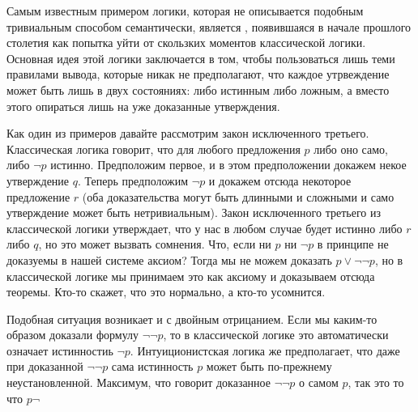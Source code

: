 Самым известным примером логики, которая не описывается подобным тривиальным способом семантически, является , появившаяся в начале прошлого столетия как попытка уйти от скользких моментов классической логики. Основная идея этой логики заключается в том, чтобы пользоваться лишь теми правилами вывода, которые никак не предполагают, что каждое утрвеждение может быть лишь в двух состояниях: либо истинным либо ложным, а вместо этого опираться лишь на уже доказанные утверждения.

Как один из примеров давайте рассмотрим закон исключенного третьего. Классическая логика говорит, что для любого предложения $p$ либо оно само, либо $\neg p$ истинно. Предположим первое, и в этом предположении докажем некое утверждение $q$. Теперь предположим $\neg p$ и докажем отсюда некоторое предложение $r$ (оба доказательства могут быть длинными и сложными и само утверждение может быть нетривиальным). Закон исключенного третьего из классической логики утверждает, что у нас в любом случае будет истинно либо $r$ либо $q$, но это может вызвать сомнения. Что, если ни $p$ ни $\neg p$ в принципе не доказуемы в нашей системе аксиом? Тогда мы не можем доказать $p \lor \neg \neg p$, но в классической логике мы принимаем это как аксиому и доказываем отсюда теоремы. Кто-то скажет, что это нормально, а кто-то усомнится.

Подобная ситуация возникает и с двойным отрицанием. Если мы каким-то образом доказали формулу $\neg\neg p$, то в классической логике это автоматически означает истинностиь $\neg p$. Интуиционистская логика же предполагает, что даже при доказанной $\neg\neg p$ сама истинность $p$ может быть по-прежнему неустановленной. Максимум, что говорит доказанное $\neg\neg p$ о самом $p$, так это то что $p\neg$